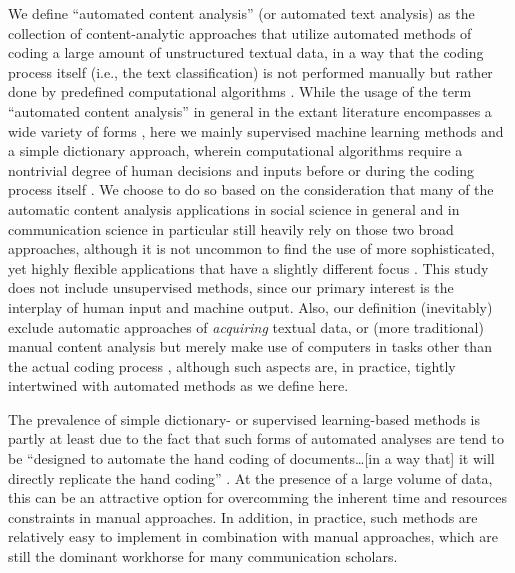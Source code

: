 \documentclass[man, 12pt, a4paper, nolmodern, noextraspace]{apa6}
\begin{document}
    We define \enquote{automated content analysis} (or automated text analysis) as the collection of content-analytic approaches that utilize automated methods of coding a large amount of unstructured textual data, in a way that the coding process itself (i.e., the text classification) is not performed manually but rather done by predefined computational algorithms \parencite{trilling2018scaling, grimmer2013text}. 
    While the usage of the term \enquote{automated content analysis} in general in the extant literature encompasses a wide variety of forms \parencites[e.g., see:][]{riff2014analyzing, Hopkins_King2010, Krippendorff2013, grimmer2013text}, here we mainly supervised machine learning methods and a simple dictionary approach, wherein computational algorithms require a nontrivial degree of human decisions and inputs before or during the coding process itself \parencite{trilling2018scaling}. We choose to do so based on the consideration that many of the automatic content analysis applications in social science in general and in communication science in particular still heavily rely on those two broad approaches, although it is not uncommon to find the use of more sophisticated, yet highly flexible applications that have a slightly different focus \parencites[such as LDA topic models:][]{maier2018applying, dimaggio2013exploiting}. This study does not include unsupervised methods, since our primary interest is the interplay of human input and machine output. Also, our definition (inevitably) exclude automatic approaches of \textit{acquiring} textual data, or (more traditional) manual content analysis but merely make use of computers in tasks other than the actual coding process \parencites[such as in data entry or data management: e.g.,][]{lewis2013content}, although such aspects are, in practice, tightly intertwined with automated methods as we define here. 
    
    The prevalence of simple dictionary- or supervised learning-based methods is partly at least due to the fact that such forms of automated analyses are tend to be \enquote{designed to automate the hand coding of documents\ldots[in a way that] it will directly replicate the hand coding} \parencites[][p. 13]{grimmer2013text}. At the presence of a large volume of data, this can be an attractive option for overcomming the inherent time and resources constraints in manual approaches. In addition, in practice, such methods are relatively easy to implement in combination with manual approaches, which are still the dominant workhorse for many communication scholars.
    
\end{document}
